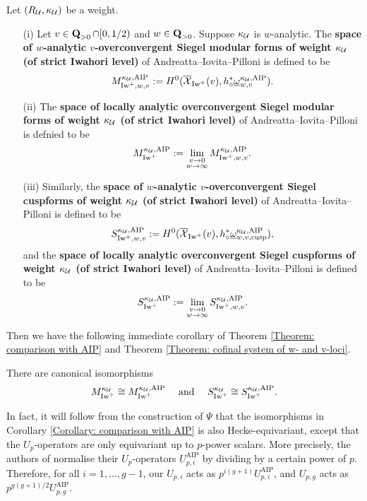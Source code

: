 \begin{Definition}\label{Definition: AIP's Siegel modular forms for strict Iwahori level}
Let $(R_{\operatorname{\mathcal{U}}}, \kappa_{\operatorname{\mathcal{U}}})$ be a weight.
\begin{enumerate}
\item[(i)] Let $v\in \operatorname{\mathbf{Q}}_{>0}\cap [0, 1/2)$ and $w\in \operatorname{\mathbf{Q}}_{>0}$. Suppose $\kappa_{\operatorname{\mathcal{U}}}$ is $w$-analytic. The \textbf{space of $w$-analytic $v$-overconvergent Siegel modular forms of weight $\kappa_{\operatorname{\mathcal{U}}}$ (of strict Iwahori level)} of Andreatta--Iovita--Pilloni is defined to be
$$M^{\kappa_{\operatorname{\mathcal{U}}}, \operatorname{AIP}}_{\operatorname{Iw}^+,w,v}:=H^0(\overline{\operatorname{\mathcal{X}}}_{\operatorname{Iw}^+}(v), h_{\diamond}^*\underline{\omega}_{w, v}^{\kappa_{\operatorname{\mathcal{U}}}, \operatorname{AIP}}).$$
\item[(ii)] The \textbf{space of locally analytic overconvergent Siegel modular forms of weight $\kappa_{\operatorname{\mathcal{U}}}$ (of strict Iwahori level)} of Andreatta--Iovita--Pilloni is defnied to be
$$M^{\kappa_{\operatorname{\mathcal{U}}}, \operatorname{AIP}}_{\operatorname{Iw}^+}:=\lim_{\substack{v\rightarrow 0\\ w\rightarrow\infty}}M^{\kappa_{\operatorname{\mathcal{U}}}, \operatorname{AIP}}_{\operatorname{Iw}^+,w,v}.$$
\item[(iii)] Similarly, the \textbf{space of $w$-analytic $v$-overconvergent Siegel cuspforms of weight $\kappa_{\operatorname{\mathcal{U}}}$ (of strict Iwahori level)} of Andreatta--Iovita--Pilloni is defined to be \[
    S_{\operatorname{Iw}^+, w, v}^{\kappa_{\operatorname{\mathcal{U}}}, \operatorname{AIP}} := H^0(\overline{\operatorname{\mathcal{X}}}_{\operatorname{Iw}^+}(v), h_{\diamond}^* \underline{\omega}_{w, v, \operatorname{cusp}}^{\kappa_{\operatorname{\mathcal{U}}}, \operatorname{AIP}}),
\] and the \textbf{space of locally analytic overconvergent Siegel cuspforms of weight $\kappa_{\operatorname{\mathcal{U}}}$ (of strict Iwahori level)} of Andreatta--Iovita--Pilloni is defined to be \[
    S_{\operatorname{Iw}^+}^{\kappa_{\operatorname{\mathcal{U}}}, \operatorname{AIP}} := \lim_{\substack{v\rightarrow 0\\ w\rightarrow\infty}}S^{\kappa_{\operatorname{\mathcal{U}}}, \operatorname{AIP}}_{\operatorname{Iw}^+,w,v}.
\]
\end{enumerate}
\end{Definition}

Then we have the following immediate corollary of Theorem \ref{Theorem: comparison with AIP} and Theorem \ref{Theorem: cofinal system of w- and v-loci}.

\begin{Corollary}\label{Corollary: comparison with AIP}
There are canonical isomorphisms
$$M^{\kappa_{\operatorname{\mathcal{U}}}}_{\operatorname{Iw}^+}\cong M^{\kappa_{\operatorname{\mathcal{U}}}, \operatorname{AIP}}_{\operatorname{Iw}^+}\quad \text{ and }\quad S_{\operatorname{Iw}^+}^{\kappa_{\operatorname{\mathcal{U}}}} \cong S_{\operatorname{Iw}^+}^{\kappa_{\operatorname{\mathcal{U}}}, \operatorname{AIP}}.$$
\end{Corollary}

\begin{Remark}
\normalfont In fact, it will follow from the construction of $\Psi$ that the isomorphisms in Corollary \ref{Corollary: comparison with AIP} is also Hecke-equivariant, except that the $U_p$-operators are only equivariant up to $p$-power scalars. More precisely, the authors of \cite{AIP-2015} normalise their $U_p$-operators $U^{\mathrm{AIP}}_{p,i}$ by dividing by a certain power of $p$. Therefore, for all $i=1,\ldots,g-1$, our $U_{p,i}$ acts as $p^{i(g+1)}U^{\mathrm{AIP}}_{p,i}$, and $U_{p,g}$ acts as $p^{g(g+1)/2}U^{\mathrm{AIP}}_{p,g}$.
\end{Remark}

